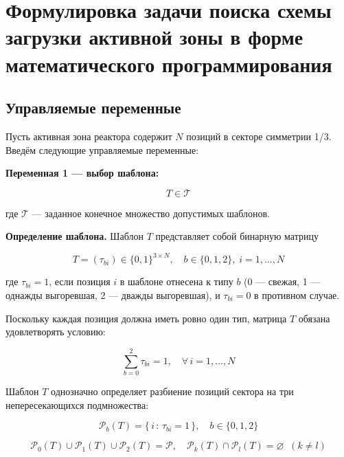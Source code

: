 \documentclass[12pt,a4paper]{article}
\begin{document}
\section*{Формулировка задачи поиска схемы загрузки активной зоны в форме математического программирования}

\subsection*{Управляемые переменные}

Пусть активная зона реактора содержит $N$ позиций в секторе симметрии 1/3. Введём следующие управляемые переменные:

\textbf{Переменная 1 --- выбор шаблона:}

\begin{equation}
T \in \mathcal{T}
\end{equation}

где $\mathcal{T}$ --- заданное конечное множество допустимых шаблонов.

\textbf{Определение шаблона.} Шаблон $T$ представляет собой бинарную матрицу

\begin{equation}
T = (\tau_{bi}) \in \{0,1\}^{3 \times N}, \quad b \in \{0,1,2\},\; i = 1,\ldots,N
\end{equation}

где $\tau_{bi} = 1$, если позиция $i$ в шаблоне отнесена к типу $b$ (0 --- свежая, 1 --- однажды выгоревшая, 2 --- дважды выгоревшая), и $\tau_{bi} = 0$ в противном случае.

Поскольку каждая позиция должна иметь ровно один тип, матрица $T$ обязана удовлетворять условию:

\begin{equation}
\sum_{b=0}^{2} \tau_{bi} = 1, \quad \forall\, i = 1,\ldots,N
\end{equation}

Шаблон $T$ однозначно определяет разбиение позиций сектора на три непересекающихся подмножества:

\begin{equation}
\mathcal{P}_b(T) = \{\, i \,:\, \tau_{bi} = 1 \,\}, \quad b \in \{0,1,2\}
\end{equation}

\begin{equation}
\mathcal{P}_0(T) \cup \mathcal{P}_1(T) \cup \mathcal{P}_2(T) = \mathcal{P}, \quad \mathcal{P}_k(T) \cap \mathcal{P}_l(T) = \varnothing \;\; (k \neq l)
\end{equation}
\end{document}
